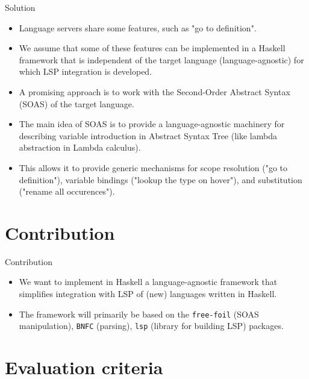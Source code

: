 \documentclass[serif, aspectratio=169]{beamer}
\let\oldcite\cite
\renewcommand{\cite}[2][]{\mbox{\oldcite[#1]{#2}}}
\begin{document}
\begin{frame}{Solution}
	\begin{itemize}
		[<+-| alert+>] %
		\item Language servers share some features, such as "go to definition".
		\item We assume that some of these features can be implemented in a Haskell framework that is independent of the target language (language-agnostic) for which LSP integration is developed.
		\item A promising approach is to work with the Second-Order Abstract Syntax (SOAS) \cite{fiore-formal-2022} of the target language.
		\item The main idea of SOAS is to provide a language-agnostic machinery for describing variable introduction in Abstract Syntax Tree (like lambda abstraction in Lambda calculus).
		\item This allows it to provide generic mechanisms for scope resolution ("go to definition"), variable bindings ("lookup the type on hover"), and substitution ("rename all occurences").
	\end{itemize}
\end{frame}

\section{Contribution}

\begin{frame}{Contribution}
	\begin{itemize}
		[<+-| alert+>] %
		\item We want to implement in Haskell a language-agnostic framework that simplifies integration with LSP of (new) languages written in Haskell.
		\item The framework will primarily be based on the \texttt{free-foil} \cite{hackage-free-foil} (SOAS manipulation), \texttt{BNFC} \cite{hackage-bnfc} (parsing), \texttt{lsp} \cite{hackage-lsp} (library for building LSP) packages.
	\end{itemize}
\end{frame}

\section{Evaluation criteria}
\label{sec:evaluation_criteria}
\end{document}
